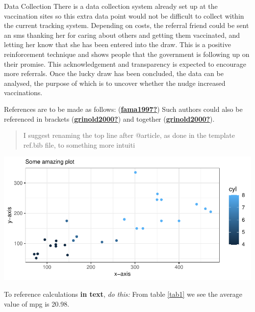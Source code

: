 \documentclass[11pt,preprint, authoryear]{elsarticle}
\let\origfigure\figure
\let\endorigfigure\endfigure
\renewenvironment{figure}[1][2] {
    \expandafter\origfigure\expandafter[H]
} {
    \endorigfigure
}
\numberwithin{equation}{section}
\numberwithin{figure}{section}
\numberwithin{table}{section}
\begin{document}
Data Collection There is a data collection system already set up at the
vaccination sites so this extra data point would not be difficult to
collect within the current tracking system. Depending on costs, the
referral friend could be sent an sms thanking her for caring about
others and getting them vaccinated, and letting her know that she has
been entered into the draw. This is a positive reinforcement technique
and shows people that the government is following up on their promise.
This acknowledgement and transparency is expected to encourage more
referrals. Once the lucky draw has been concluded, the data can be
analysed, the purpose of which is to uncover whether the nudge increased
vaccinations.

References are to be made as follows:
(\protect\hyperlink{ref-fama1997}{\textbf{fama1997?}}) Such authors
could also be referenced in brackets
(\protect\hyperlink{ref-grinold2000}{\textbf{grinold2000?}}) and
together (\protect\hyperlink{ref-grinold2000}{\textbf{grinold2000?}}).

\begin{quote}
I suggest renaming the top line after @article, as done in the template
ref.bib file, to something more intuiti
\end{quote}

\begin{figure}[H]

{\centering \includegraphics{Write_Up_files/figure-latex/Figure1-1} 

}

\caption{Caption Here \label{Figure1}}\label{fig:Figure1}
\end{figure}

To reference calculations \textbf{in text}, \emph{do this:} From table
\ref{tab1} we see the average value of mpg is 20.98.
\end{document}
